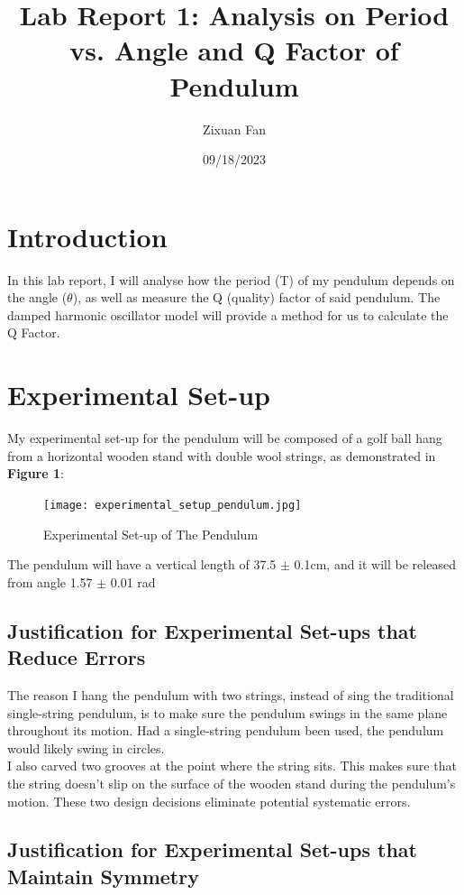 \documentclass{article}
\title{Lab Report 1: Analysis on Period vs. Angle and Q Factor of Pendulum}
\author{Zixuan Fan}
\date{09/18/2023}
\begin{document}
\maketitle
\section{Introduction}

In this lab report, I will analyse how the period (T) of my pendulum depends on the angle ($\theta$), as well as measure the Q (quality) factor of said pendulum. The damped harmonic oscillator model will provide a method for us to calculate the Q Factor.

\section{Experimental Set-up}

My experimental set-up for the pendulum will be composed of a golf ball hang from a horizontal wooden stand with double wool strings, as demonstrated in \textbf{Figure 1}:

\begin{figure}[!htb]
	\centering
	\texttt{[image: experimental\_setup\_pendulum.jpg]}
	\caption{Experimental Set-up of The Pendulum}
	\label{fig_angle}
\end{figure}

\noindent The pendulum will have a vertical length of 37.5 $\pm$ 0.1cm, and it will be released from angle 1.57 $\pm$ 0.01 rad

\subsection{Justification for Experimental Set-ups that Reduce Errors}

The reason I hang the pendulum with two strings, instead of sing the traditional single-string pendulum, is to make sure the pendulum swings in the same plane throughout its motion. Had a single-string pendulum been used, the pendulum would likely swing in circles.\\

\noindent I also carved two grooves at the point where the string sits. This makes sure that the string doesn't slip on the surface of the wooden stand during the pendulum's motion. These two design decisions eliminate potential systematic errors.

\subsection{Justification for Experimental Set-ups that Maintain Symmetry}
\end{document}
